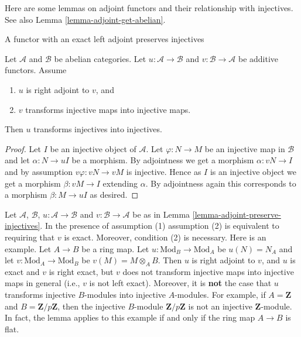 \noindent
Here are some lemmas on adjoint functors and their relationship with
injectives. See also Lemma \ref{lemma-adjoint-get-abelian}.

\begin{lemma}
\label{lemma-adjoint-preserve-injectives}
\begin{slogan}
A functor with an exact left adjoint preserves injectives
\end{slogan}
Let $\mathcal{A}$ and $\mathcal{B}$ be abelian categories.
Let $u : \mathcal{A} \to \mathcal{B}$ and
$v : \mathcal{B} \to \mathcal{A}$ be additive functors. Assume
\begin{enumerate}
\item $u$ is right adjoint to $v$, and
\item $v$ transforms injective maps into injective maps.
\end{enumerate}
Then $u$ transforms injectives into injectives.
\end{lemma}

\begin{proof}
Let $I$ be an injective object of $\mathcal{A}$.
Let $\varphi : N \to M$ be an injective map in $\mathcal{B}$ and let
$\alpha : N \to uI$ be a morphism.
By adjointness we get a morphism $\alpha : vN \to I$ and
by assumption $v\varphi : vN \to vM$ is injective.
Hence as $I$ is an injective object we get a morphism
$\beta : vM \to I$ extending $\alpha$. By adjointness
again this corresponds to a morphism $\beta : M \to uI$ as
desired.
\end{proof}

\begin{remark}
\label{remark-need-left-exactness}
Let $\mathcal{A}$, $\mathcal{B}$, $u : \mathcal{A} \to \mathcal{B}$ and
$v : \mathcal{B} \to \mathcal{A}$ be as in
Lemma \ref{lemma-adjoint-preserve-injectives}.
In the presence of assumption (1) assumption (2) is equivalent to requiring
that $v$ is exact. Moreover, condition (2) is necessary. Here is an example.
Let $A \to B$ be a ring map.
Let $u : \text{Mod}_B \to \text{Mod}_A$ be $u(N) = N_A$
and let $v : \text{Mod}_A \to \text{Mod}_B$ be
$v(M) = M \otimes_A B$. Then $u$ is right adjoint to $v$, and $u$ is
exact and $v$ is right exact, but $v$ does not transform injective maps into
injective maps in general (i.e., $v$ is not left exact).
Moreover, it is {\bf not} the case that $u$ transforms injective
$B$-modules into injective $A$-modules. For example, if
$A = \mathbf{Z}$ and $B = \mathbf{Z}/p\mathbf{Z}$, then
the injective $B$-module $\mathbf{Z}/p\mathbf{Z}$ is not
an injective $\mathbf{Z}$-module. In fact, the lemma applies to this
example if and only if the ring map $A \to B$ is flat.
\end{remark}

